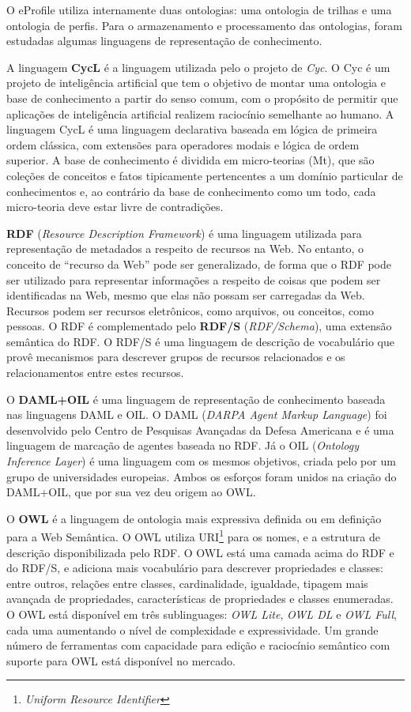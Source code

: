 O eProfile utiliza internamente duas ontologias: uma ontologia de trilhas e uma ontologia de perfis. Para o armazenamento e processamento das ontologias, foram estudadas algumas linguagens de representação de conhecimento.

A linguagem \textbf{CycL} é a linguagem utilizada pelo o projeto de \emph{Cyc}\cite{lenat89}. O Cyc é um projeto de inteligência artificial que tem o objetivo de montar uma ontologia e base de conhecimento a partir do senso comum, com o propósito de permitir que aplicações de inteligência artificial realizem raciocínio semelhante ao humano. A linguagem CycL é uma linguagem declarativa baseada em lógica de primeira ordem clássica, com extensões para operadores modais e lógica de ordem superior. A base de conhecimento é dividida em micro-teorias (Mt), que são coleções de conceitos e fatos tipicamente pertencentes a um domínio particular de conhecimentos e, ao contrário da base de conhecimento como um todo, cada micro-teoria deve estar livre de contradições.

\textbf{RDF} (\emph{Resource Description Framework}) é uma linguagem utilizada para representação de metadados a respeito de recursos na Web\cite{rdf}. No entanto, o conceito de ``recurso da Web'' pode ser generalizado, de forma que o RDF pode ser utilizado para representar informações a respeito de coisas que podem ser identificadas na Web, mesmo que elas não possam ser carregadas da Web. Recursos podem ser recursos eletrônicos, como arquivos, ou conceitos, como pessoas. O RDF é complementado pelo \textbf{RDF/S} (\emph{RDF/Schema}), uma extensão semântica do RDF. O RDF/S é uma linguagem de descrição de vocabulário que provê mecanismos para descrever grupos de recursos relacionados e os relacionamentos entre estes recursos\cite{rdfs}.

O \textbf{DAML+OIL} é uma linguagem de representação de conhecimento baseada nas linguagens DAML e OIL. O DAML (\emph{DARPA Agent Markup Language}) foi desenvolvido pelo Centro de Pesquisas Avançadas da Defesa Americana e é uma linguagem de marcação de agentes baseada no RDF. Já o OIL (\emph{Ontology Inference Layer}) é uma linguagem com os mesmos objetivos, criada pelo por um grupo de universidades europeias. Ambos os esforços foram unidos na criação do DAML+OIL, que por sua vez deu origem ao OWL\cite{daconta03}.

O \textbf{OWL} é a linguagem de ontologia mais expressiva definida ou em definição para a Web Semântica\cite{daconta03}. O OWL utiliza URI\footnote{\emph{Uniform Resource Identifier}} para os nomes, e a estrutura de descrição disponibilizada pelo RDF. O OWL está uma camada acima do RDF e do RDF/S, e adiciona mais vocabulário para descrever propriedades e classes: entre outros, relações entre classes, cardinalidade, igualdade, tipagem mais avançada de propriedades, características de propriedades e classes enumeradas\cite{owl-guide}. O OWL está disponível em três sublinguages: \emph{OWL Lite}, \emph{OWL DL} e \emph{OWL Full}, cada uma aumentando o nível de complexidade e expressividade. Um grande número de ferramentas com capacidade para edição e raciocínio semântico com suporte para OWL está disponível no mercado.

